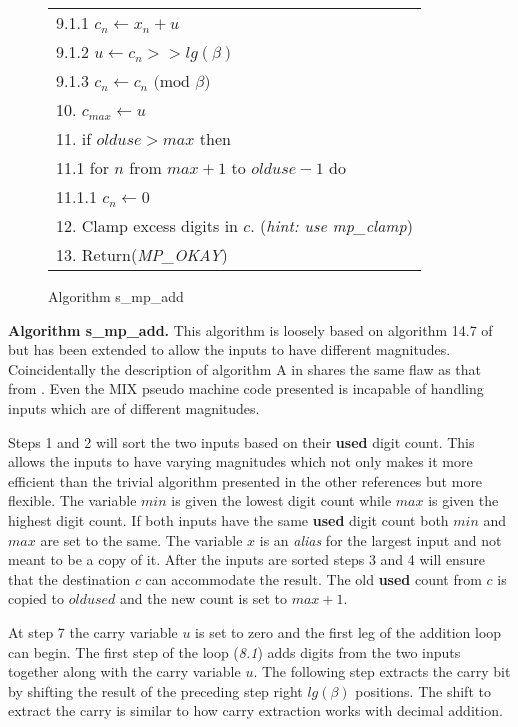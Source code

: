 \documentclass[b5paper]{book}
\begin{document}
\begin{figure}[!here]
\begin{center}
\begin{small}
\begin{tabular}{l}
\hspace{+6mm}9.1.1  $c_n \leftarrow x_n + u$ \\
\hspace{+6mm}9.1.2  $u \leftarrow c_n >> lg(\beta)$ \\
\hspace{+6mm}9.1.3  $c_n \leftarrow c_n \mbox{ (mod }\beta\mbox{)}$ \\
10.  $c_{max} \leftarrow u$ \\
11.  if $olduse > max$ then \\
\hspace{+3mm}11.1  for $n$ from $max + 1$ to $olduse - 1$ do \\
\hspace{+6mm}11.1.1  $c_n \leftarrow 0$ \\
12.  Clamp excess digits in $c$.  (\textit{hint: use mp\_clamp}) \\
13.  Return(\textit{MP\_OKAY}) \\
\hline
\end{tabular}
\end{small}
\end{center}
\caption{Algorithm s\_mp\_add}
\end{figure}

\textbf{Algorithm s\_mp\_add.}
This algorithm is loosely based on algorithm 14.7 of \cite[pp. 594]{HAC} but has been extended to allow the inputs to have different magnitudes.  
Coincidentally the description of algorithm A in \cite[pp. 266]{TAOCPV2} shares the same flaw as that from \cite{HAC}.  Even the MIX pseudo 
machine code presented  \cite[pp. 266-267]{TAOCPV2} is incapable of handling inputs which are of different magnitudes.

Steps 1 and 2 will sort the two inputs based on their \textbf{used} digit count.  This allows the inputs to have varying magnitudes which not 
only makes it more efficient than the trivial algorithm presented in the other references but more flexible.  The variable $min$ is given the lowest 
digit count while $max$ is given the highest digit count.  If both inputs have the same \textbf{used} digit count both $min$ and $max$ are 
set to the same.  The variable $x$ is an \textit{alias} for the largest input and not meant to be a copy of it.  After the inputs are sorted steps 
3 and 4 will ensure that the destination $c$ can accommodate the result.  The old \textbf{used} count from $c$ is copied to $oldused$ and the 
new count is set to $max + 1$.  

At step 7 the carry variable $u$ is set to zero and the first leg of the addition loop can begin.  The first step of the loop (\textit{8.1}) adds
digits from the two inputs together along with the carry variable $u$.  The following step extracts the carry bit by shifting the result of the
preceding step right $lg(\beta)$ positions.  The shift to extract the carry is similar to how carry extraction works with decimal addition.
\end{document}
